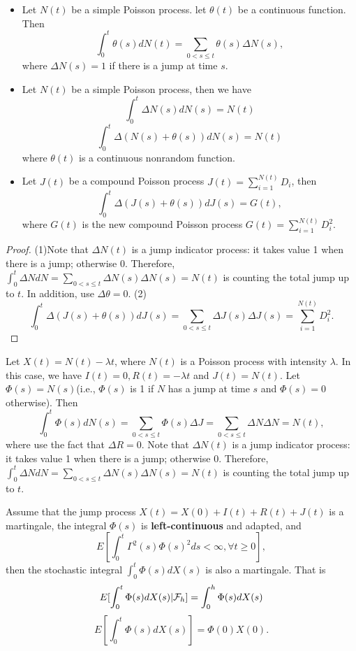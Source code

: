 \begin{refsection}
\begin{lemma}\hfill
	
	\begin{itemize}
		\item Let $N(t)$ be a simple Poisson process. let $\theta(t)$ be a continuous function. Then
		$$\int_0^t \theta(s) dN(t) = \sum_{0<s\leq t} \theta(s)\Delta N(s),$$
		where $\Delta N(s) = 1$ if there is a jump at time $s$.
		
		
		\item Let $N(t)$ be a simple Poisson process, then we have
		$$\int_0^t \Delta N(s)dN(s) = N(t)$$
		$$\int_0^t \Delta(N(s) + \theta(s))dN(s) = N(t)$$
		where $\theta(t)$ is a continuous nonrandom function.
		\item Let $J(t)$  be a compound Poisson process $J(t) = \sum_{i=1}^{N(t)} D_i$, then
		$$\int_0^t \Delta(J(s) + \theta(s))dJ(s) = G(t),$$
		where $G(t)$ is the new compound Poisson process $G(t) = \sum_{i=1}^{N(t)} D_i^2$.	 
	\end{itemize}
\end{lemma}
\begin{proof}
	(1)Note that $\Delta N(t)$ is a jump  indicator process: it takes value 1 when there is a jump; otherwise 0. Therefore, $\int_0^t \Delta N dN = \sum_{0<s\leq t} \Delta N(s)\Delta N(s) = N(t)$ is counting the total jump up to $t$. In addition, use $\Delta \theta = 0$.
	(2) $$\int_0^t \Delta(J(s) + \theta(s))dJ(s) = \sum_{0<s\leq t} \Delta J(s) \Delta J(s)  = \sum_{i=1}^{N(t)} D_i^2.$$
	
\end{proof}

\begin{example}
	Let $X(t) = N(t) - \lambda t$, where $N(t)$ is a Poisson process with intensity $\lambda$. In this case, we have $I(t) = 0, R(t) = -\lambda t$ and $J(t) = N(t)$. Let $\Phi(s) = N(s)$(i.e., $\Phi(s)$ is 1 if $N$ has a jump at time $s$ and $\Phi(s) = 0$ otherwise). Then
	$$\int_0^t \Phi(s)dN(s) = \sum_{0<s\leq t} \Phi(s)\Delta J = \sum_{0<s\leq t} \Delta N\Delta N = N(t),$$
	where use the fact that $\Delta R = 0.$
	Note that $\Delta N(t)$ is a jump  indicator process: it takes value 1 when there is a jump; otherwise 0. Therefore, $\int_0^t \Delta N dN = \sum_{0<s\leq t} \Delta N(s)\Delta N(s) = N(t)$ is counting the total jump up to $t$.
\end{example}



\begin{theorem}\cite[477]{shreve2004stochastic2}\label{ch:theory-of-stochastic-process:th:leftcontinuousintegrandMartingale}
	Assume that the jump process $X(t) = X(0) + I(t) + R(t) + J(t)$ is a martingale, the integral $\Phi(s)$ is \textbf{left-continuous} and adapted, and 
	$$E[\int_0^t\Gamma^2(s)\Phi(s)^2 ds < \infty, \forall t \geq 0],$$
	then the stochastic integral $\int_0^t \Phi(s)dX(s)$ is also a martingale. That is
	$$E[\int_0^t \Phi(s)dX(s)|\mathcal{F}_h] = \int_0^h \Phi(s)dX(s)$$
	$$E[\int_0^t \Phi(s)dX(s)] = \Phi(0)X(0).$$
\end{theorem}




\end{refsection}
